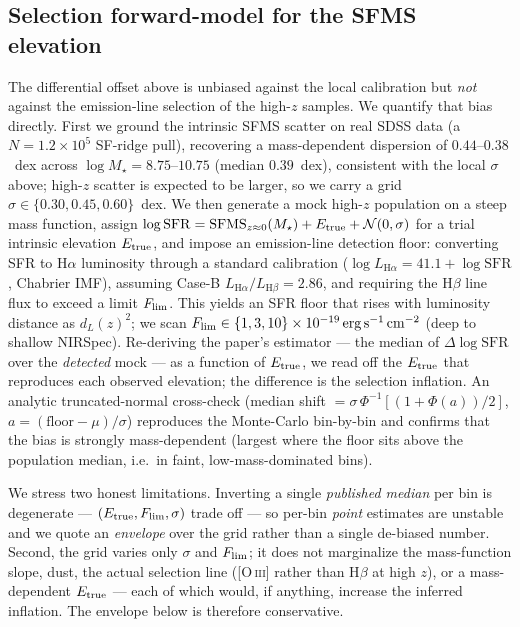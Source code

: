 \documentclass[twocolumn]{aastex631}
\begin{document}
\subsection{Selection forward-model for the SFMS elevation}\label{sec:selmodel}
The differential offset above is unbiased against the local calibration but \emph{not} against the emission-line selection of the high-$z$ samples. We quantify that bias directly. First we ground the intrinsic SFMS scatter on real SDSS data (a $N=1.2\times10^{5}$ SF-ridge pull), recovering a mass-dependent dispersion of $0.44$--$0.38$~dex across $\log M_\star\!=\!8.75$--$10.75$ (median $0.39$~dex), consistent with the local $\sigma$ above; high-$z$ scatter is expected to be larger, so we carry a grid $\sigma\in\{0.30,0.45,0.60\}$~dex. We then generate a mock high-$z$ population on a steep mass function, assign $\log\mathrm{SFR}=\mathrm{SFMS}_{z\approx0}(M_\star)+E_{\rm true}+\mathcal{N}(0,\sigma)$ for a trial intrinsic elevation $E_{\rm true}$, and impose an emission-line detection floor: converting SFR to H$\alpha$ luminosity through a standard calibration ($\log L_{\mathrm{H}\alpha}=41.1+\log\mathrm{SFR}$, Chabrier IMF), assuming Case-B $L_{\mathrm{H}\alpha}/L_{\mathrm{H}\beta}=2.86$, and requiring the H$\beta$ line flux to exceed a limit $F_{\rm lim}$. This yields an SFR floor that rises with luminosity distance as $d_L(z)^2$; we scan $F_{\rm lim}\in\{1,3,10\}\times10^{-19}\,\mathrm{erg\,s^{-1}\,cm^{-2}}$ (deep to shallow NIRSpec). Re-deriving the paper's estimator --- the median of $\Delta\log\mathrm{SFR}$ over the \emph{detected} mock --- as a function of $E_{\rm true}$, we read off the $E_{\rm true}$ that reproduces each observed elevation; the difference is the selection inflation. An analytic truncated-normal cross-check (median shift $=\sigma\,\Phi^{-1}[(1+\Phi(a))/2]$, $a=(\mathrm{floor}-\mu)/\sigma$) reproduces the Monte-Carlo bin-by-bin and confirms that the bias is strongly mass-dependent (largest where the floor sits above the population median, i.e.\ in faint, low-mass-dominated bins).

We stress two honest limitations. Inverting a single \emph{published median} per bin is degenerate --- $(E_{\rm true},F_{\rm lim},\sigma)$ trade off --- so per-bin \emph{point} estimates are unstable and we quote an \emph{envelope} over the grid rather than a single de-biased number. Second, the grid varies only $\sigma$ and $F_{\rm lim}$; it does not marginalize the mass-function slope, dust, the actual selection line ([O\,\textsc{iii}] rather than H$\beta$ at high $z$), or a mass-dependent $E_{\rm true}$ --- each of which would, if anything, increase the inferred inflation. The envelope below is therefore conservative.
\end{document}
